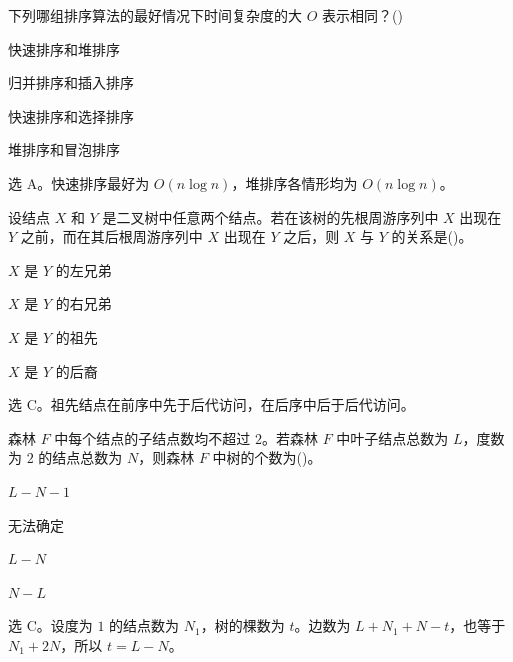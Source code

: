 \begin{question}
下列哪组排序算法的最好情况下时间复杂度的大 $O$ 表示相同？(\quad)
\begin{choiceoptions}[2]
  \item 快速排序和堆排序
  \item 归并排序和插入排序
  \item 快速排序和选择排序
  \item 堆排序和冒泡排序
\end{choiceoptions}
\begin{solution}
选 A。快速排序最好为 $O(n\log n)$，堆排序各情形均为 $O(n\log n)$。
\end{solution}
\end{question}

\begin{question}
设结点 $X$ 和 $Y$ 是二叉树中任意两个结点。若在该树的先根周游序列中 $X$ 出现在 $Y$ 之前，而在其后根周游序列中 $X$ 出现在 $Y$ 之后，则 $X$ 与 $Y$ 的关系是(\quad)。
\begin{choiceoptions}[1]
  \item $X$ 是 $Y$ 的左兄弟
  \item $X$ 是 $Y$ 的右兄弟
  \item $X$ 是 $Y$ 的祖先
  \item $X$ 是 $Y$ 的后裔
\end{choiceoptions}
\begin{solution}
选 C。祖先结点在前序中先于后代访问，在后序中后于后代访问。
\end{solution}
\end{question}

\begin{question}
森林 $F$ 中每个结点的子结点数均不超过 $2$。若森林 $F$ 中叶子结点总数为 $L$，度数为 $2$ 的结点总数为 $N$，则森林 $F$ 中树的个数为(\quad)。
\begin{choiceoptions}[1]
  \item $L-N-1$
  \item 无法确定
  \item $L-N$
  \item $N-L$
\end{choiceoptions}
\begin{solution}
选 C。设度为 $1$ 的结点数为 $N_1$，树的棵数为 $t$。边数为 $L+N_1+N-t$，也等于 $N_1+2N$，所以 $t=L-N$。
\end{solution}
\end{question}

